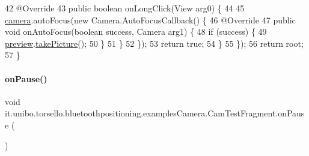 \begin{DoxyCode}
42             @Override
43             \textcolor{keyword}{public} \textcolor{keywordtype}{boolean} onLongClick(View arg0) \{
44 
45                 \hyperlink{classit_1_1unibo_1_1torsello_1_1bluetoothpositioning_1_1examplesCamera_1_1CamTestFragment_ae0d0a876ac5ce037c020f5362d3e1887_ae0d0a876ac5ce037c020f5362d3e1887}{camera}.autoFocus(\textcolor{keyword}{new} Camera.AutoFocusCallback() \{
46                     @Override
47                     \textcolor{keyword}{public} \textcolor{keywordtype}{void} onAutoFocus(\textcolor{keywordtype}{boolean} success, Camera arg1) \{
48                         \textcolor{keywordflow}{if} (success) \{
49                             \hyperlink{classit_1_1unibo_1_1torsello_1_1bluetoothpositioning_1_1examplesCamera_1_1CamTestFragment_ae917d2bc3cab2f7a1641a78cce044fd9_ae917d2bc3cab2f7a1641a78cce044fd9}{preview}.\hyperlink{classit_1_1unibo_1_1torsello_1_1bluetoothpositioning_1_1examplesCamera_1_1Preview_afa7f533cc47be1bf7be2b1d1bfa43600_afa7f533cc47be1bf7be2b1d1bfa43600}{takePicture}();
50                         \}
51                     \}
52                 \});
53                 \textcolor{keywordflow}{return} \textcolor{keyword}{true};
54             \}
55         \});
56         \textcolor{keywordflow}{return} root;
57     \}
\end{DoxyCode}
\hypertarget{classit_1_1unibo_1_1torsello_1_1bluetoothpositioning_1_1examplesCamera_1_1CamTestFragment_ab42acc697b4d94a34ea514a53bc8ce02_ab42acc697b4d94a34ea514a53bc8ce02}{}\label{classit_1_1unibo_1_1torsello_1_1bluetoothpositioning_1_1examplesCamera_1_1CamTestFragment_ab42acc697b4d94a34ea514a53bc8ce02_ab42acc697b4d94a34ea514a53bc8ce02} 
\paragraph{\texorpdfstring{on\+Pause()}{onPause()}}
{\footnotesize\ttfamily void it.\+unibo.\+torsello.\+bluetoothpositioning.\+examples\+Camera.\+Cam\+Test\+Fragment.\+on\+Pause (\begin{DoxyParamCaption}{ }\end{DoxyParamCaption})}


